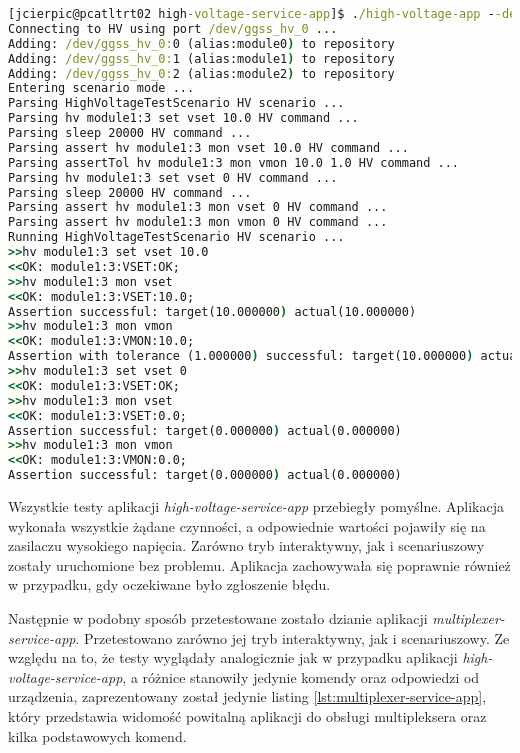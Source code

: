 \begin{lstlisting}[language=cmd,caption={Uruchomienie aplikacji \emph{high-voltage-service-app} w trybie scenariuszowym},label={lst:high-voltage-service-app-commands},frame=single]
[jcierpic@pcatltrt02 high-voltage-service-app]$ ./high-voltage-app --dev-port=/dev/ggss_hv_0 --dev-modules=3 --scenario-file=./sample_scenario.yml --scenarios=HighVoltageTestScenario
Connecting to HV using port /dev/ggss_hv_0 ...
Adding: /dev/ggss_hv_0:0 (alias:module0) to repository
Adding: /dev/ggss_hv_0:1 (alias:module1) to repository
Adding: /dev/ggss_hv_0:2 (alias:module2) to repository
Entering scenario mode ...
Parsing HighVoltageTestScenario HV scenario ...
Parsing hv module1:3 set vset 10.0 HV command ...
Parsing sleep 20000 HV command ...
Parsing assert hv module1:3 mon vset 10.0 HV command ...
Parsing assertTol hv module1:3 mon vmon 10.0 1.0 HV command ...
Parsing hv module1:3 set vset 0 HV command ...
Parsing sleep 20000 HV command ...
Parsing assert hv module1:3 mon vset 0 HV command ...
Parsing assert hv module1:3 mon vmon 0 HV command ...
Running HighVoltageTestScenario HV scenario ...
>>hv module1:3 set vset 10.0
<<OK: module1:3:VSET:OK;
>>hv module1:3 mon vset
<<OK: module1:3:VSET:10.0;
Assertion successful: target(10.000000) actual(10.000000)
>>hv module1:3 mon vmon
<<OK: module1:3:VMON:10.0;
Assertion with tolerance (1.000000) successful: target(10.000000) actual(10.000000)
>>hv module1:3 set vset 0
<<OK: module1:3:VSET:OK;
>>hv module1:3 mon vset
<<OK: module1:3:VSET:0.0;
Assertion successful: target(0.000000) actual(0.000000)
>>hv module1:3 mon vmon
<<OK: module1:3:VMON:0.0;
Assertion successful: target(0.000000) actual(0.000000)
\end{lstlisting}

Wszystkie testy aplikacji \emph{high-voltage-service-app} przebiegły pomyślne. Aplikacja wykonała wszystkie żądane czynności, a odpowiednie wartości pojawiły się na zasilaczu wysokiego napięcia. Zarówno tryb interaktywny, jak i scenariuszowy zostały uruchomione bez problemu. Aplikacja zachowywała się poprawnie również w przypadku, gdy oczekiwane było zgłoszenie błędu.

Następnie w podobny sposób przetestowane zostało dzianie aplikacji \emph{multiplexer-service-app}. Przetestowano zarówno jej tryb interaktywny, jak i scenariuszowy. Ze względu na to, że testy wyglądały analogicznie jak w przypadku aplikacji \emph{high-voltage-service-app}, a różnice stanowiły jedynie komendy oraz odpowiedzi od urządzenia, zaprezentowany został jedynie listing \ref{lst:multiplexer-service-app}, który przedstawia widomość powitalną aplikacji do obsługi multipleksera oraz kilka podstawowych komend.

